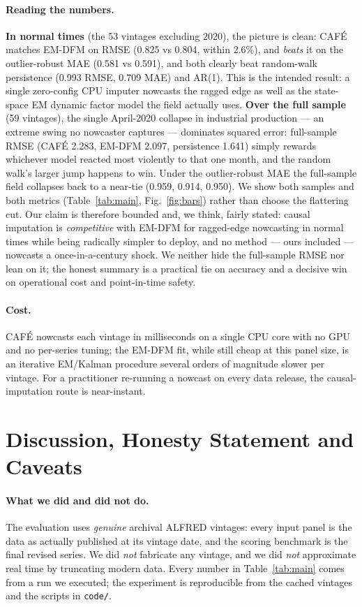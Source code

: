 \documentclass[11pt]{article}
\newcommand{\cafe}{CAF\'E}
\begin{document}
\paragraph{Reading the numbers.} \textbf{In normal times} (the 53 vintages excluding 2020), the picture is clean: \cafe{} matches EM-DFM on RMSE (0.825 vs 0.804, within 2.6\%), and \emph{beats} it on the outlier-robust MAE (0.581 vs 0.591), and both clearly beat random-walk persistence (0.993 RMSE, 0.709 MAE) and AR(1). This is the intended result: a single zero-config CPU imputer nowcasts the ragged edge as well as the state-space EM dynamic factor model the field actually uses. \textbf{Over the full sample} (59 vintages), the single April-2020 collapse in industrial production --- an extreme swing no nowcaster captures --- dominates squared error: full-sample RMSE (\cafe{} 2.283, EM-DFM 2.097, persistence 1.641) simply rewards whichever model reacted most violently to that one month, and the random walk's larger jump happens to win. Under the outlier-robust MAE the full-sample field collapses back to a near-tie (0.959, 0.914, 0.950). We show both samples and both metrics (Table~\ref{tab:main}, Fig.~\ref{fig:bars}) rather than choose the flattering cut. Our claim is therefore bounded and, we think, fairly stated: causal imputation is \emph{competitive} with EM-DFM for ragged-edge nowcasting in normal times while being radically simpler to deploy, and no method --- ours included --- nowcasts a once-in-a-century shock. We neither hide the full-sample RMSE nor lean on it; the honest summary is a practical tie on accuracy and a decisive win on operational cost and point-in-time safety.

\paragraph{Cost.} \cafe{} nowcasts each vintage in milliseconds on a single CPU core with
no GPU and no per-series tuning; the EM-DFM fit, while still cheap at this panel size, is
an iterative EM/Kalman procedure several orders of magnitude slower per vintage. For a
practitioner re-running a nowcast on every data release, the causal-imputation route is
near-instant.

\section{Discussion, Honesty Statement and Caveats}
\paragraph{What we did and did not do.} The evaluation uses \emph{genuine} archival
ALFRED vintages: every input panel is the data as actually published at its vintage date,
and the scoring benchmark is the final revised series. We did \emph{not} fabricate any
vintage, and we did \emph{not} approximate real time by truncating modern data. Every
number in Table~\ref{tab:main} comes from a run we executed; the experiment is
reproducible from the cached vintages and the scripts in \texttt{code/}.
\end{document}
